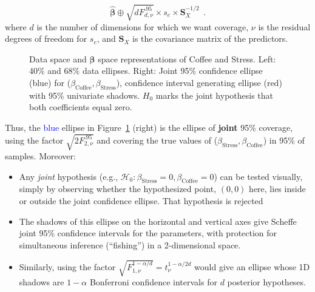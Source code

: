 \documentclass[
  letterpaper,
  10pt,
  krantz2]{krantz}
\providecommand{\tightlist}{%
  \setlength{\itemsep}{0pt}\setlength{\parskip}{0pt}}\usepackage{longtable,booktabs,array}
\begin{document}
\[
 \widehat{\mathbf{\beta}} \oplus \sqrt{d F^{.95}_{d, \nu}} \times s_e \times \mathbf{S}_X^{-1/2} \:\: .
\] where \(d\) is the number of dimensions for which we want coverage,
\(\nu\) is the residual degrees of freedom for \(s_e\), and
\(\mathbf{S}_X\) is the covariance matrix of the predictors.

\begin{figure}


\caption{\label{fig-coffee-data-beta-both}Data space and
\(\mathbf{\beta}\) space representations of Coffee and Stress. Left:
40\% and 68\% data ellipses. Right: Joint 95\% confidence ellipse (blue)
for (\(\beta_{\text{Coffee}}, \beta_{\text{Stress}}\)), confidence
interval generating ellipse (red) with 95\% univariate shadows. \(H_0\)
marks the joint hypothesis that both coefficients equal zero.}

\end{figure}%

Thus, the \textcolor{blue}{blue} ellipse in
Figure~\ref{fig-coffee-data-beta-both} (right) is the ellipse of
\textbf{joint} 95\% coverage, using the factor
\(\sqrt{2 F^{.95}_{2, \nu}}\) and covering the true values of
(\(\beta_{\mathrm{Stress}}, \beta_{\mathrm{Coffee}}\)) in 95\% of
samples. Moreover:

\begin{itemize}
\tightlist
\item
  Any \emph{joint} hypothesis (e.g.,
  \(\mathcal{H}_0:\beta_{\mathrm{Stress}}=0, \beta_{\mathrm{Coffee}}=0\))
  can be tested visually, simply by observing whether the hypothesized
  point, \((0, 0)\) here, lies inside or outside the joint confidence
  ellipse. That hypothesis is rejected
\item
  The shadows of this ellipse on the horizontal and vertical axes give
  Scheff\textquotesingle e joint 95\% confidence intervals for the
  parameters, with protection for simultaneous inference (``fishing'')
  in a 2-dimensional space.
\item
  Similarly, using the factor
  \(\sqrt{F^{1-\alpha/d}_{1, \nu}} = t^{1-\alpha/2d}_\nu\) would give an
  ellipse whose 1D shadows are \(1-\alpha\) Bonferroni confidence
  intervals for \(d\) posterior hypotheses.
\end{itemize}
\end{document}

